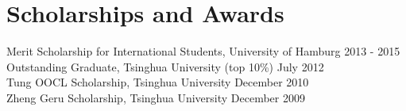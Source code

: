 \documentclass[a4paper,11pt]{article} %
\begin{document}

\section{Scholarships and Awards}

Merit Scholarship for International Students, University of Hamburg \hfill 2013 - 2015 \\
Outstanding Graduate, Tsinghua University (top 10\%) \hfill July 2012 \\
Tung OOCL Scholarship, Tsinghua University \hfill December 2010  \\
Zheng Geru Scholarship, Tsinghua University \hfill December 2009

\fi

\end{document}

